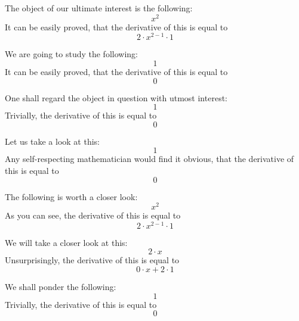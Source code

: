 \documentclass{article}
\begin{document}
The object of our ultimate interest is the following:
\begin{equation}
x ^{2 } 
\end{equation}
It can be easily proved, that the derivative of this is equal to
\begin{equation}
2 \cdot x ^{2 - 1 } \cdot 1 
\end{equation}

We are going to study the following:
\begin{equation}
1 
\end{equation}
It can be easily proved, that the derivative of this is equal to
\begin{equation}
0 
\end{equation}

One shall regard the object in question with utmost interest:
\begin{equation}
1 
\end{equation}
Trivially, the derivative of this is equal to
\begin{equation}
0 
\end{equation}

Let us take a look at this:
\begin{equation}
1 
\end{equation}
Any self-respecting mathematician would find it obvious, that the derivative of this is equal to
\begin{equation}
0 
\end{equation}

The following is worth a closer look:
\begin{equation}
x ^{2 } 
\end{equation}
As you can see, the derivative of this is equal to
\begin{equation}
2 \cdot x ^{2 - 1 } \cdot 1 
\end{equation}

We will take a closer look at this:
\begin{equation}
2 \cdot x 
\end{equation}
Unsurprisingly, the derivative of this is equal to
\begin{equation}
0 \cdot x + 2 \cdot 1 
\end{equation}

We shall ponder the following:
\begin{equation}
1 
\end{equation}
Trivially, the derivative of this is equal to
\begin{equation}
0 
\end{equation}
\end{document}
